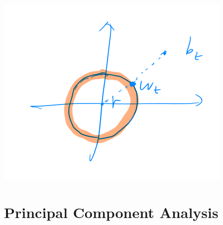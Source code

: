 \documentclass[12pt]{article}
\begin{document}
    \includegraphics{graph.PNG}
    
    \section{Principal Component Analysis}
\end{document}
